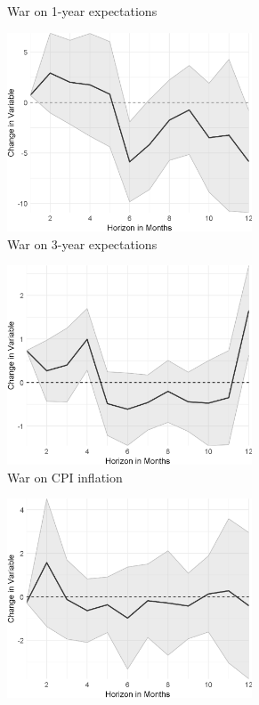 \begin{figure}
\begin{subfigure}{00.24\textwidth}
		\caption{War on 1-year expectations}
	\end{subfigure}
	\begin{subfigure}{00.24\textwidth}
		\includegraphics[width=0.8\textwidth]{output/lp/baseline/bHP/war/waronexpectations3y_djn.eps}
		\caption{War on 3-year expectations}
	\end{subfigure}
	\begin{subfigure}{00.24\textwidth}
		\includegraphics[width=0.8\textwidth]{output/lp/baseline/bHP/war/waroninflation_djn.eps}
		\caption{War on CPI inflation}
	\end{subfigure}
	\begin{subfigure}{00.24\textwidth}
		\includegraphics[width=0.8\textwidth]{output/lp/baseline/bHP/war/waroneconac_djn.eps}

\end{subfigure}
\end{figure}
